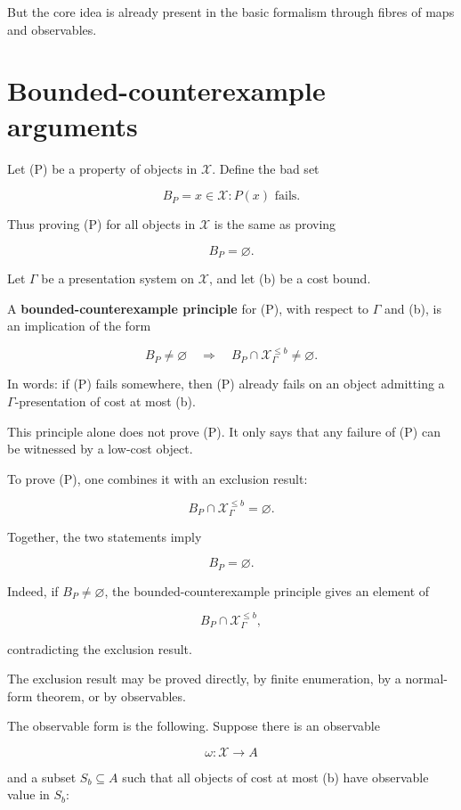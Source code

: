 \documentclass[11pt]{article}
\begin{document}
But the core idea is already present in the basic formalism through fibres of maps and observables.


\section{Bounded-counterexample arguments}

Let (P) be a property of objects in \(\mathcal X\). Define the bad set

\[
B_P={x\in\mathcal X : P(x)\text{ fails}}.
\]

Thus proving (P) for all objects in \(\mathcal X\) is the same as proving

\[
B_P=\varnothing.
\]

Let \(\Gamma\) be a presentation system on \(\mathcal X\), and let (b) be a cost bound.

A \textbf{bounded-counterexample principle} for (P), with respect to \(\Gamma\) and (b), is an implication of the form

\[
B_P\neq\varnothing
\quad\Longrightarrow\quad
B_P\cap \mathcal X_\Gamma^{\leq b}\neq\varnothing.
\]

In words: if (P) fails somewhere, then (P) already fails on an object admitting a \(\Gamma\)-presentation of cost at most (b).

This principle alone does not prove (P). It only says that any failure of (P) can be witnessed by a low-cost object.

To prove (P), one combines it with an exclusion result:

\[
B_P\cap \mathcal X_\Gamma^{\leq b}=\varnothing.
\]

Together, the two statements imply

\[
B_P=\varnothing.
\]

Indeed, if \(B_P\neq\varnothing\), the bounded-counterexample principle gives an element of

\[
B_P\cap \mathcal X_\Gamma^{\leq b},
\]

contradicting the exclusion result.

The exclusion result may be proved directly, by finite enumeration, by a normal-form theorem, or by observables.

The observable form is the following. Suppose there is an observable

\[
\omega:\mathcal X\to A
\]

and a subset \(S_b\subseteq A\) such that all objects of cost at most (b) have observable value in \(S_b\):
\end{document}
